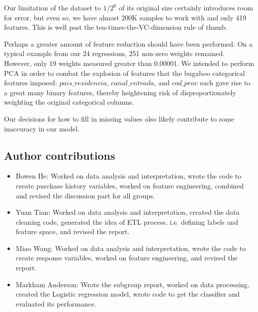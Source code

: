 \documentclass{article}
\begin{document}
\begin{spacing}{1}
\begin{large}
Our limitation of the dataset to $1/2^6$ of its original size certainly introduces room for error, but even so, we have almost 200K samples to work with and only 419 features. This is well past the ten-times-the-VC-dimension rule of thumb.\cite{amlbook}

Perhaps a greater amount of feature reduction should have been performed. On a typical example from our 24 regressions, 251 non-zero weights remained. However, only 19 weights measured greater than 0.00001. We intended to perform PCA in order to combat the explosion of features that the bugaboo categorical features imposed: $pais\_residencia$, $canal\_entrada$, and $cod\_prov$ each gave rise to a great many binary features, thereby heightening risk of disproportionately weighting the original categorical columns.

Our decisions for how to fill in missing values also likely contribute to some inaccuracy in our model.

\subsection{Author contributions}
\begin{itemize}
	\item Bowen He:  Worked on data analysis and interpretation, wrote the code to create purchase history variables, worked on feature engineering, combined and revised the discussion part for all groups.
	
	\item Yuan Tian:  Worked on data analysis and interpretation, created the data cleaning code, generated the idea of ETL process, i.e. defining labels and feature space, and revised the report.
	
	\item Miao Wang:  Worked on data analysis and interpretation, wrote the code to create response variables, worked on feature engineering, and revised the report.
	
	\item Markham Anderson: Wrote the subgroup report, worked on data processing, created the Logistic regression model, wrote code to get the classifier and evaluated its performance.
\end{itemize}

\newpage

\begin{appendices}
	

\end{appendices}
\end{large}
\end{spacing}
\end{document}
